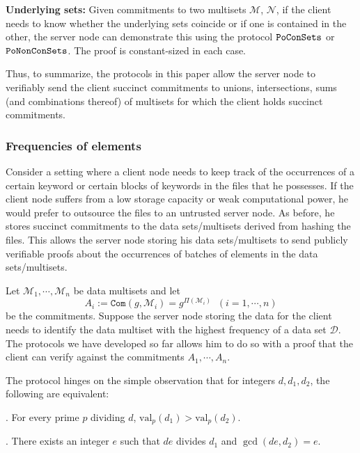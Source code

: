 \documentclass[11pt, lettersize, notitlepage, leqno, footskip=0.6cm]{article}
\newcommand{\ttt}{\texttt}
\newcommand{\mc}{\mathcal}
\newcommand{\mr}{\mathrm}
\newcommand{\vs}{\vspace{-0.15cm}}
\newcommand{\noin}{\noindent}
\numberwithin{equation}{section}
\begin{document}
\bigskip

\noin \textbf{Underlying sets:} Given commitments to two multisets $\mc{M}$, $\mc{N}$, if the client needs to know whether the underlying sets coincide or if one is contained in the other, the server  node can demonstrate this using the protocol $\tt{PoConSets}$ or  $\tt{PoNonConSets}$. The proof is constant-sized in each case.

\vspace{0.2cm}

Thus, to summarize, the protocols in this paper allow the server node to verifiably send the client succinct commitments to unions, intersections, sums (and combinations thereof) of multisets for which the client holds succinct commitments.  

\subsubsection{\fontsize{11}{11} Frequencies of elements}

Consider a setting where a client node needs to keep track of the occurrences of a certain keyword or certain blocks of keywords in the files that he possesses. If the client node suffers from a low storage capacity or weak computational power, he would prefer to outsource the files to an untrusted server node. As before, he stores succinct commitments to the data sets/multisets derived from hashing the files. This allows the server node storing his data sets/multisets to send publicly verifiable proofs about the occurrences of batches of elements in the data sets/multisets.

Let $\mc{M}_1,\cdots, \mc{M}_n$ be data multisets and let \vs $$A_i:= \ttt{Com}(g,\mc{M}_i) = g^{\Pi(\mc{M}_i)}\;\;(i=1,\cdots,n) $$ be the commitments. Suppose the server node storing the data for the client needs to identify the data multiset with the highest frequency of a data set $\mc{D}$. The protocols we have developed so far allows him to do so with a proof that the client can verify against the commitments $A_1,\cdots,A_n$.

The protocol hinges on the simple observation that for integers $d,d_1,d_2$, the following are equivalent:

\noin 1. For every prime $p$ dividing $d$, $\mr{val}_p(d_1) > \mr{val}_p(d_2).$

\noin 2. There exists an integer $e$ such that $de$ divides $d_1$ and $\gcd(de, d_2) = e$.

\vspace{0.1cm}
\end{document}
